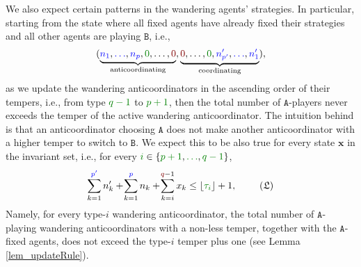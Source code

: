 \documentclass[10 pt,twocolumn,journal]{IEEEtran}
\DeclarePairedDelimiter{\floor}{\lfloor}{\rfloor}
\theoremstyle{plain}
\newcommand{\A}{\mathcal{A}}
\newcommand{\x}{\bm{x}}
\newcommand{\p}{\tb{p}}
\newcommand{\pp}{\tb{p'}}
\newcommand{\q}{\tr{q}}
\renewcommand{\A}{\mathtt{A}}
\newcommand{\B}{\mathtt{B}}
\newcommand{\tb}{\textcolor{blue}}
\newcommand{\tr}{\textcolor{Myred}}
\newcommand{\tg}{\textcolor{Mygreen}}
\theoremstyle{definition}
\begin{document}
We also expect certain patterns in the wandering agents' strategies.
In particular, starting from the state where all fixed agents have already fixed their strategies and all other agents are playing $\B$, i.e., 
\begin{equation*}
    (\underbrace{\tb{n_1},\tb{\ldots},\tb{n_{\p}},\tg{0},\ldots,\tr{0}}_{\text{anticoordinating}}, 
    \underbrace{\tr{0},\ldots,\tg{0}, \tb{n'_{\pp }}, \tb{\ldots}, \tb{n'_1}}_{\text{coordinating}}),
\end{equation*}
as we update the wandering anticoordinators in the ascending order of their tempers, i.e., from type $\tg{q-1}$ to $\tg{p+1}$, then the total number of $\A$-players never exceeds the temper of the active wandering anticoordinator. 
The intuition behind is that an anticoordinator choosing $\A$ does not make another anticoordinator with a higher temper to switch to $\B$.
We expect this to be also true for every state $\x$ in the invariant set, i.e., for every $\tg{i}\in\{\tg{p+1},\tg{\ldots},\tg{q-1}\}$,
\begin{equation*}
    \sum_{k=1}^{\pp} n'_k +\! \sum_{k=1}^{\p} n_k +\! \sum_{k=i}^{\q-1} x_k \leq \floor{\tg{\tau_{\tg{i}}}}+1,\  \tag{$\mathfrak{L}$}\label{L}
\end{equation*}
Namely, for every type-$i$ wandering anticoordinator, 
the total number of $\A$-playing wandering anticoordinators with a non-less temper, together with the $\A$-fixed agents, does not exceed the type-$i$ temper plus one (see Lemma \ref{lem_updateRule}).
\end{document}

